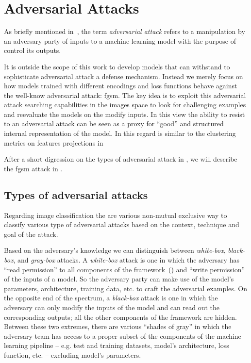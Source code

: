 \section{Adversarial Attacks}
\label{sec:adversarial-attacks-model-evaluation}

As briefly mentioned in~, the term \emph{adversarial attack} refers to a manipulation by an adversary party of inputs to a machine learning model with the purpose of control its outputs.

It is outside the scope of this work to develop models that can withstand to sophisticate adversarial attack a defense mechanism. Instead we merely focus on how models trained with different encodings and loss functions behave against the well-know adversarial attack: \acrfull{fgsm}. The key idea is to exploit this adversarial attack searching capabilities in the images space to look for challenging examples and reevaluate the models on the modify inputs. In this view the ability to resist to an adversarial attack can be seen as a proxy for ``good'' and structured internal representation of the model. In this regard is similar to the clustering metrics on features projections in 

After a short digression on the types of adversarial attack in , we will describe the \acrshort{fgsm} attack in .

\subsection{Types of adversarial attacks}
\label{subsec:types-adversarial-attacks}
Regarding image classification the are various non-mutual exclusive way to classify various type of adversarial attacks based on the context, technique and goal of the attack.

Based on the adversary's knowledge we can distinguish between \emph{white-box}, \emph{black-box}, and \emph{gray-box} attacks.
A \emph{white-box} attack is one in which the adversary has ``read permission'' to all components of the framework~() and ``write permission'' of the inputs of a model. So the adversary party can make use of the model's parameters, architecture, training data, etc. to craft the adversarial examples.
On the opposite end of the spectrum, a \emph{black-box} attack is one in which the adversary can only modify the inputs of the model and can read out the corresponding outputs; all the other components of the framework are hidden.
Between these two extremes, there are various ``shades of gray'' in which the adversary team has access to a proper subset of the components of the machine learning pipeline -- e.g. test and training datasets, model's architecture, loss function, etc. -- excluding model's parameters.

